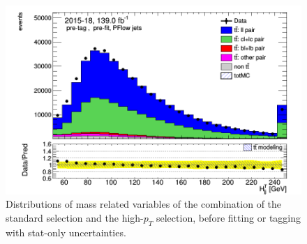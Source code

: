 \documentclass[letterpaper,12pt]{article}
\begin{document}
\begin{figure}
\begin{minipage}[b]{.45\textwidth}
\end{minipage}\hfill
\begin{minipage}[b]{.45\textwidth}
\centering
\includegraphics[width=1\textwidth]{Oct_distributions/pretagNoRwDL1rwithhighpTPFlow_scaledall/DataMC_Htjj.png}
\end{minipage}\hfill
\caption{Distributions of mass related variables of the combination of the standard selection and the high-$p_T$ selection, before fitting or tagging with stat-only uncertainties.} \label{fig:mass_PFlow}
\end{figure}
\end{document}
